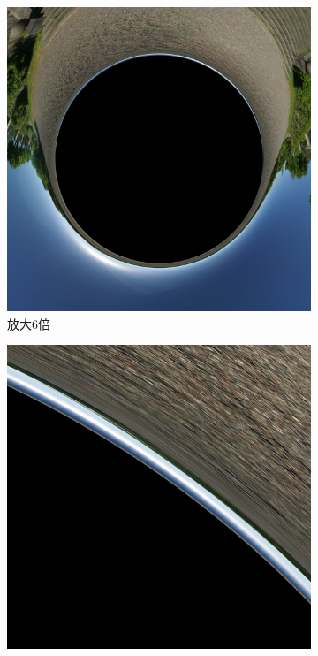 \begin{figure}[H]
    \centering
    \begin{subfigure}{.33\textwidth}
        \centering
        \includegraphics[width=.95\linewidth]{images/zoomin_6x.png}
        \caption{放大6倍}
        \label{fig:zoomin-6x} %
    \end{subfigure}%
    \begin{subfigure}{.33\textwidth}
        \centering
        \includegraphics[width=.95\linewidth]{images/zoomin_60x.png}

\end{subfigure}
\end{figure}
